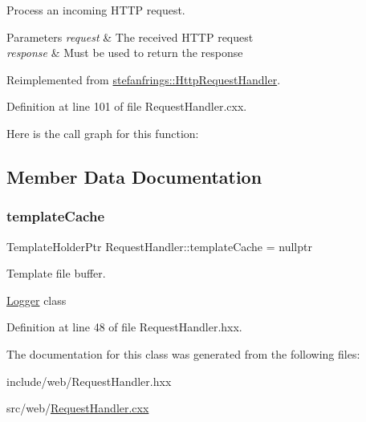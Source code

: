 Process an incoming H\+T\+TP request. 


\begin{DoxyParams}{Parameters}
{\em request} & The received H\+T\+TP request \\
\hline
{\em response} & Must be used to return the response \\
\hline
\end{DoxyParams}


Reimplemented from \mbox{\hyperlink{classstefanfrings_1_1_http_request_handler_a0a7210907152c46b8b5a47feb64cf6bd}{stefanfrings\+::\+Http\+Request\+Handler}}.



Definition at line 101 of file Request\+Handler.\+cxx.

Here is the call graph for this function\+:


\subsection{Member Data Documentation}
\mbox{\label{classeven_1_1_request_handler_a9125480e85bb68d2e1a4eb14f411c80a}} 
\subsubsection{\texorpdfstring{template\+Cache}{templateCache}}
{\footnotesize\ttfamily Template\+Holder\+Ptr Request\+Handler\+::template\+Cache = nullptr\hspace{0.3cm}{\ttfamily [static]}}



Template file buffer. 

\mbox{\hyperlink{classeven_1_1_logger}{Logger}} class 

Definition at line 48 of file Request\+Handler.\+hxx.



The documentation for this class was generated from the following files\+:\begin{DoxyCompactItemize}
\item 
include/web/Request\+Handler.\+hxx\item 
src/web/\mbox{\hyperlink{_request_handler_8cxx}{Request\+Handler.\+cxx}}\end{DoxyCompactItemize}
